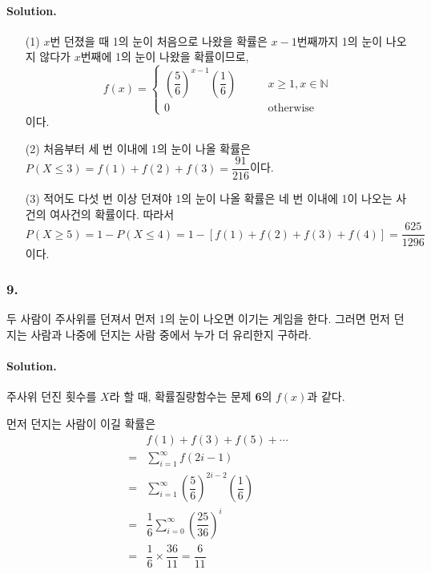 \paragraph{Solution.}
\begin{itemize}
	\item[(1)] $x$번 던졌을 때 1의 눈이 처음으로 나왔을 확률은 $x - 1$번째까지 1의 눈이 나오지 않다가 $x$번째에 1의 눈이 나왔을 확률이므로, \[f\left(x\right) = \left\{
\begin{array}{ll}
	\left(\dfrac{5}{6}\right)^{x - 1}\left(\dfrac{1}{6}\right) & \qquad x \geq 1, x \in \mathbb{N} \\
	0 & \qquad\textrm{otherwise}
\end{array}
\right. \]이다.
	\item[(2)] 처음부터 세 번 이내에 1의 눈이 나올 확률은 $P\left(X \leq 3\right) = f\left(1\right) + f\left(2\right) + f\left(3\right) = \dfrac{91}{216}$이다.
	\item[(3)] 적어도 다섯 번 이상 던져야 1의 눈이 나올 확률은 네 번 이내에 1이 나오는 사건의 여사건의 확률이다. 따라서 \[P\left(X \geq 5\right) = 1 - P\left(X \leq 4\right) = 1 - \left[f\left(1\right) + f\left(2\right) + f\left(3\right) + f\left(4\right)\right] = \dfrac{625}{1296}\]이다.
\end{itemize}

\subsubsection{9.} 두 사람이 주사위를 던져서 먼저 1의 눈이 나오면 이기는 게임을 한다. 그러면 먼저 던지는 사람과 나중에 던지는 사람 중에서 누가 더 유리한지 구하라.

\paragraph{Solution.} 주사위 던진 횟수를 $X$라 할 때, 확률질량함수는 문제 \textbf{6}의 $f\left(x\right)$과 같다.

먼저 던지는 사람이 이길 확률은 
\begin{align*}
	&f\left(1\right) + f\left(3\right) + f\left(5\right) + \cdots \\
	=&\sum_{i = 1}^{\infty} f\left(2i - 1\right) \\
	=&\sum_{i = 1}^{\infty} \left(\dfrac{5}{6}\right)^{2i - 2}\left(\dfrac{1}{6}\right) \\
	=&\dfrac{1}{6} \sum_{i = 0}^{\infty} \left(\dfrac{25}{36}\right)^{i} \\
	=&\dfrac{1}{6} \times \dfrac{36}{11} = \dfrac{6}{11}
\end{align*}

